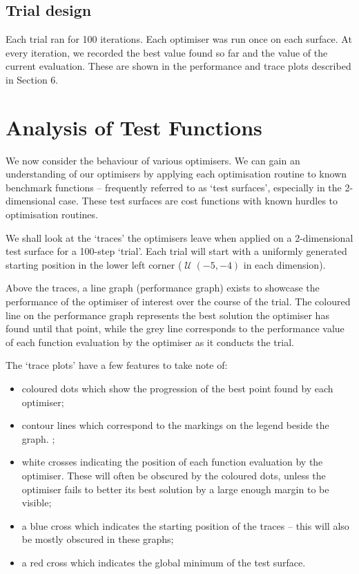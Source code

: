 \documentclass[
  a4paper,
  DIV=11,
  numbers=noendperiod]{scrartcl}
\newcommand{\+}{\phantom{-}}
\newcommand{\op}[2]{\operatorname{#1}\left(#2\right)}
\begin{document}
\subsection{Trial design}\label{trial-design}

Each trial ran for 100 iterations. Each optimiser was run once on each
surface. At every iteration, we recorded the best value found so far and
the value of the current evaluation. These are shown in the performance
and trace plots described in Section 6.

\section{Analysis of Test Functions}\label{analysis-of-test-functions}

We now consider the behaviour of various optimisers. We can gain an
understanding of our optimisers by applying each optimisation routine to
known benchmark functions -- frequently referred to as `test surfaces',
especially in the 2-dimensional case. These test surfaces are cost
functions with known hurdles to optimisation routines.

We shall look at the `traces' the optimisers leave when applied on a
2-dimensional test surface for a 100-step `trial'. Each trial will start
with a uniformly generated starting position in the lower left corner
(\(\op{\mathcal U}{-5,-4}\) in each dimension).

Above the traces, a line graph (performance graph) exists to showcase
the performance of the optimiser of interest over the course of the
trial. The coloured line on the performance graph represents the best
solution the optimiser has found until that point, while the grey line
corresponds to the performance value of each function evaluation by the
optimiser as it conducts the trial.

The `trace plots' have a few features to take note of:

\begin{itemize}
\item{coloured dots} which show the progression of the best point found by each optimiser;
\item{contour lines} which correspond to the markings on the legend beside the graph. ;
\item{white crosses} indicating the position of each function evaluation by the optimiser. These will often be obscured by the coloured dots, unless the optimiser fails to better its best solution by a large enough margin to be visible; 
\item{a blue cross} which indicates the starting position of the traces -- this will also be mostly obscured in these graphs;
\item{a red cross} which indicates the global minimum of the test surface.
\end{itemize}
\end{document}
